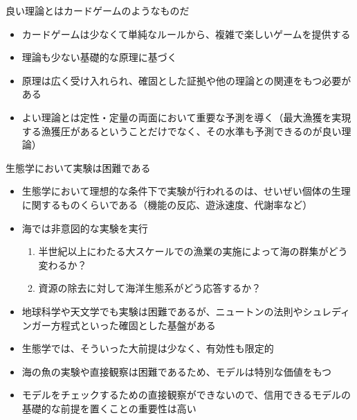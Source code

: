 \documentclass[
  ignorenonframetext,
]{beamer}
\providecommand{\tightlist}{%
  \setlength{\itemsep}{0pt}\setlength{\parskip}{0pt}}
\newcommand{\vspacelarge}{\vspace{6mm}}
\newcommand{\vspacesmall}{\vspace{3mm}}
\begin{document}
\begin{frame}{良い理論とはカードゲームのようなものだ}
\protect\hypertarget{ux826fux3044ux7406ux8ad6ux3068ux306fux30abux30fcux30c9ux30b2ux30fcux30e0ux306eux3088ux3046ux306aux3082ux306eux3060}{}

\begin{itemize}
\tightlist
\item
  カードゲームは少なくて単純なルールから、複雑で楽しいゲームを提供する\\
  \vspacelarge
\item
  理論も少ない基礎的な原理に基づく \vspacelarge
\item
  原理は広く受け入れられ、確固とした証拠や他の理論との関連をもつ必要がある\\
  \vspacelarge
\item
  よい理論とは定性・定量の両面において重要な予測を導く（最大漁獲を実現する漁獲圧があるということだけでなく、その水準も予測できるのが良い理論）
\end{itemize}

\end{frame}

\begin{frame}{生態学において実験は困難である}
\protect\hypertarget{ux751fux614bux5b66ux306bux304aux3044ux3066ux5b9fux9a13ux306fux56f0ux96e3ux3067ux3042ux308b}{}

\begin{itemize}
\tightlist
\item
  生態学において理想的な条件下で実験が行われるのは、せいぜい個体の生理に関するものくらいである（機能の反応、遊泳速度、代謝率など）\\
  \vspacesmall
\item
  海では非意図的な実験を実行

  \begin{enumerate}
  \tightlist
  \item
    半世紀以上にわたる大スケールでの漁業の実施によって海の群集がどう変わるか？\\
  \item
    資源の除去に対して海洋生態系がどう応答するか？
  \end{enumerate}
\end{itemize}

\vspacesmall

\begin{itemize}
\tightlist
\item
  地球科学や天文学でも実験は困難であるが、ニュートンの法則やシュレディンガー方程式といった確固とした基盤がある\\
  \vspacesmall
\item
  生態学では、そういった大前提は少なく、有効性も限定的\\
  \vspacesmall
\item
  海の魚の実験や直接観察は困難であるため、モデルは特別な価値をもつ\\
  \vspacesmall
\item
  モデルをチェックするための直接観察ができないので、信用できるモデルの基礎的な前提を置くことの重要性は高い
\end{itemize}

\end{frame}
\end{document}
